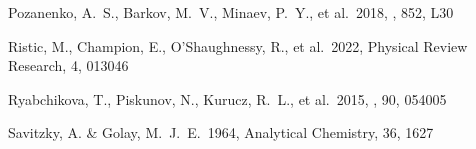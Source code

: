 \documentclass[twocolumn,twocolappendix]{aastex63}
\begin{document}
\begin{thebibliography}{}





 Pozanenko, A.~S., Barkov, M.~V., Minaev, P.~Y., et al.\ 2018, \apjl, 852, L30






 Ristic, M., Champion, E., O'Shaughnessy, R., et al.\ 2022, Physical Review Research, 4, 013046














 Ryabchikova, T., Piskunov, N., Kurucz, R.~L., et al.\ 2015, \physscr, 90, 054005




 Savitzky, A. \& Golay, M.~J.~E.\ 1964, Analytical Chemistry, 36, 1627



\end{thebibliography}
\end{document}
